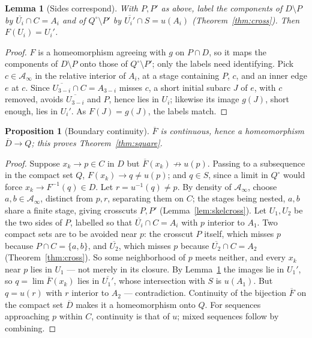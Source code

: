 \documentclass[11pt,a4paper]{article}
\theoremstyle{jsplain}
\newtheorem{lemma}[theorem]{Lemma}
\newtheorem{proposition}[theorem]{Proposition}
\theoremstyle{jsdefn}
\begin{document}
\begin{lemma}[Sides correspond]\label{lem:sides}
With $P,P'$ as above, label the components of $D\setminus P$ by
$\overline{U_i}\cap C=A_i$ and of $Q^\circ\setminus P'$ by
$\overline{U_i'}\cap S=u(A_i)$ \textup(Theorem~\ref{thm:cross}\textup).
Then $F(U_i)=U_i'$.
\end{lemma}
\begin{proof}
$F$ is a homeomorphism agreeing with $g$ on $P\cap D$, so it maps the
components of $D\setminus P$ onto those of $Q^\circ\setminus P'$; only
the labels need identifying. Pick $c\in \mathcal A_\infty$ in the relative
interior of $A_i$, at a stage containing $P$, $c$, and an inner
edge $e$ at $c$. Since $\overline{U_{3-i}}\cap C=A_{3-i}$ misses $c$,
a short initial subarc $J$ of $e$, with $c$ removed, avoids
$\overline{U_{3-i}}$ and $P$, hence lies in $U_i$; likewise its image
$g(J)$, short enough, lies in $U_i'$. As $F(J)=g(J)$, the labels
match.
\end{proof}

\begin{proposition}[Boundary continuity]\label{prop:bdry}
$\overline F$ is continuous, hence a homeomorphism
$\overline D\to Q$; this proves Theorem~\ref{thm:square}.
\end{proposition}
\begin{proof}
Suppose $x_k\to p\in C$ in $D$ but
$\overline F(x_k)\not\to u(p)$. Passing to a subsequence in the
compact set $Q$, $F(x_k)\to q\ne u(p)$; and $q\in S$, since a limit in
$Q^\circ$ would force $x_k\to F^{-1}(q)\in D$. Let $r=u^{-1}(q)\ne p$.
By density of $\mathcal A_\infty$, choose $a,b\in \mathcal A_\infty$, distinct from
$p,r$, separating them on $C$; the stages being nested, $a,b$ share a
finite stage, giving crosscuts $P,P'$
(Lemma~\ref{lem:skelcross}). Let $U_1,U_2$ be the two sides of $P$,
labelled so that $\overline{U_i}\cap C=A_i$ with $p$ interior to $A_1$.
Two compact sets are to be avoided near $p$: the crosscut $P$ itself,
which misses $p$ because $P\cap C=\{a,b\}$, and $\overline{U_2}$, which
misses $p$ because $\overline{U_2}\cap C=A_2$
(Theorem~\ref{thm:cross}). So some neighborhood of $p$ meets neither,
and every $x_k$ near $p$ lies in $U_1$ --- not merely in its closure.
By Lemma~\ref{lem:sides} the images lie in $U_1'$, so
$q=\lim\overline F(x_k)$ lies in $\overline{U_1'}$, whose intersection
with $S$ is $u(A_1)$. But $q=u(r)$ with $r$ interior to $A_2$ ---
contradiction. Continuity of the bijection $\overline F$ on the
compact set $\overline D$ makes it a homeomorphism onto $Q$. For
sequences approaching $p$ within $C$, continuity is that of $u$;
mixed sequences follow by combining. \end{proof}
\end{document}
